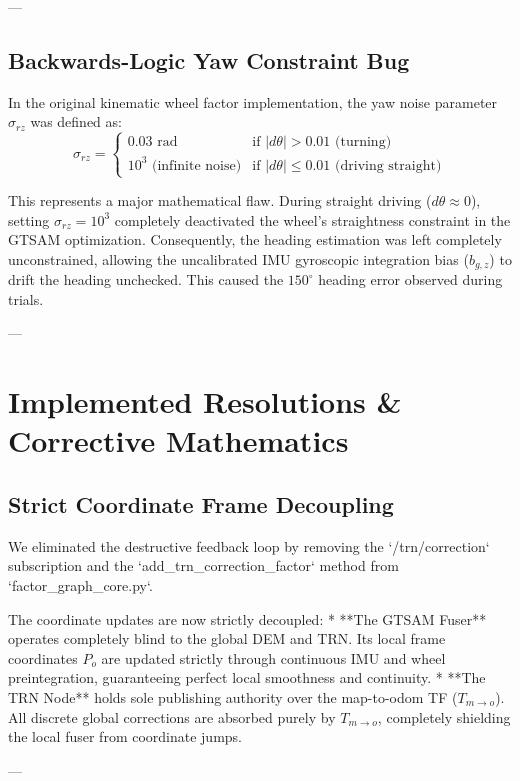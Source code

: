\documentclass[10pt,journal,compsoc]{IEEEtran}
\begin{document}
---

\subsection{Backwards-Logic Yaw Constraint Bug}
In the original kinematic wheel factor implementation, the yaw noise parameter $\sigma_{rz}$ was defined as:
\begin{equation}
    \sigma_{rz} = \begin{cases} 0.03\text{ rad} & \text{if } |d\theta| > 0.01\text{ (turning)} \\ 10^3\text{ (infinite noise)} & \text{if } |d\theta| \le 0.01\text{ (driving straight)} \end{cases}
\end{equation}

This represents a major mathematical flaw. During straight driving ($d\theta \approx 0$), setting $\sigma_{rz} = 10^3$ completely deactivated the wheel's straightness constraint in the GTSAM optimization. Consequently, the heading estimation was left completely unconstrained, allowing the uncalibrated IMU gyroscopic integration bias ($b_{g,z}$) to drift the heading unchecked. This caused the $150^\circ$ heading error observed during trials.

---

\section{Implemented Resolutions \& Corrective Mathematics}

\subsection{Strict Coordinate Frame Decoupling}
We eliminated the destructive feedback loop by removing the `/trn/correction` subscription and the `add_trn_correction_factor` method from `factor_graph_core.py`. 

The coordinate updates are now strictly decoupled:
* **The GTSAM Fuser** operates completely blind to the global DEM and TRN. Its local frame coordinates $P_o$ are updated strictly through continuous IMU and wheel preintegration, guaranteeing perfect local smoothness and continuity.
* **The TRN Node** holds sole publishing authority over the map-to-odom TF ($T_{m \to o}$). All discrete global corrections are absorbed purely by $T_{m \to o}$, completely shielding the local fuser from coordinate jumps.

---
\end{document}
